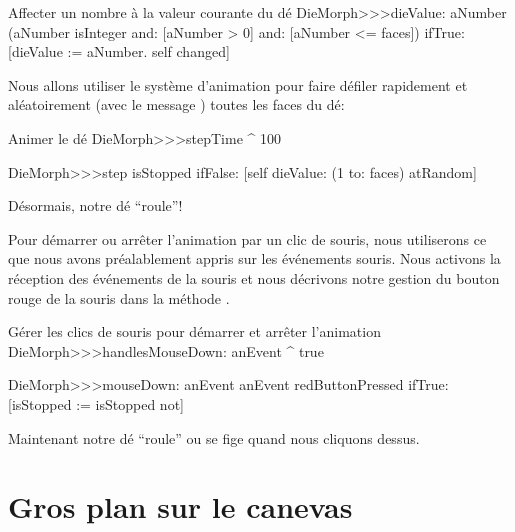 \documentclass[a4paper,10pt,twoside]{book}
\begin{document}
\begin{method}{Affecter un nombre \`a la valeur courante du dé}
DieMorph>>>dieValue: aNumber
	(aNumber isInteger
			and: [aNumber > 0]
			and: [aNumber <= faces])
		ifTrue:
			[dieValue := aNumber.
			self changed]
\end{method}

Nous allons utiliser le système d'animation pour faire défiler rapidement 
et aléatoirement (avec le message ) toutes les faces du dé:
\begin{methods}{Animer le dé}
DieMorph>>>stepTime
	^ 100

DieMorph>>>step
	isStopped ifFalse: [self dieValue: (1 to: faces) atRandom]
\end{methods}
Désormais, notre dé ``roule''!

Pour démarrer ou arrêter  l'animation par un clic de souris, nous
utiliserons ce que nous avons préalablement appris sur les
événements souris.
Nous activons la réception des événements de la souris et nous
décrivons notre gestion du bouton rouge de la souris dans la
méthode .       

\begin{methods}{Gérer les clics de souris pour démarrer et arrêter l'animation}
DieMorph>>>handlesMouseDown: anEvent
	^ true

DieMorph>>>mouseDown: anEvent
	anEvent redButtonPressed
		ifTrue: [isStopped := isStopped not]
\end{methods}

Maintenant notre dé ``roule'' ou se fige quand nous cliquons dessus.



\section{Gros plan sur le canevas}
\end{document}

